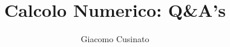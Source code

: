 \documentclass{article}
\begin{document}
\title{Calcolo Numerico: Q\&A's}
\author{Giacomo Cusinato}
\maketitle




\end{document}
